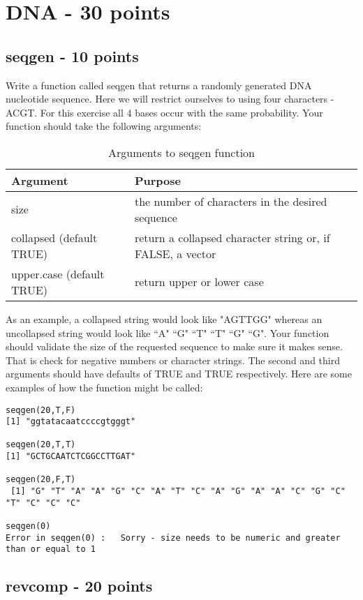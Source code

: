 \documentclass{article}
\begin{document}
\section{DNA - 30 points}

\subsection{seqgen - 10 points}Write a function called seqgen that returns a randomly generated DNA nucleotide sequence. Here we will restrict ourselves to using four characters - ACGT. For this exercise all 4 bases occur with the same probability. Your function should take the following arguments:

\begin{table}[ht]
\caption{Arguments to seqgen function}
\begin{tabular}{l | l}
\hline\hline
Argument & Purpose \\ [1ex]
\hline
size & the number of characters in the desired sequence \\ [1ex]
\hline 
collapsed (default TRUE) & return a collapsed character string or, if FALSE, a vector  \\ [1ex]
\hline
upper.case (default TRUE) & return upper or lower case \\ [1ex]
\end{tabular}
\label{table:nonlin}
\end{table}

As an example, a collapsed string would look like  "AGTTGG" whereas an uncollapsed string would look like ``A" ``G" ``T" ``T" ``G" ``G". Your function should validate the size of the requested sequence to make sure it makes sense. That is check for negative numbers or character strings. The second and third arguments should have defaults of TRUE and TRUE respectively. Here are some examples of how the function might be called:

\begin{verbatim}
seqgen(20,T,F)
[1] "ggtatacaatccccgtgggt"

seqgen(20,T,T)
[1] "GCTGCAATCTCGGCCTTGAT"

seqgen(20,F,T)
 [1] "G" "T" "A" "A" "G" "C" "A" "T" "C" "A" "G" "A" "A" "C" "G" "C" "T" "C" "C" "C"

seqgen(0)
Error in seqgen(0) :   Sorry - size needs to be numeric and greater than or equal to 1

\end{verbatim}

\subsection{revcomp - 20 points} 
\end{document}
